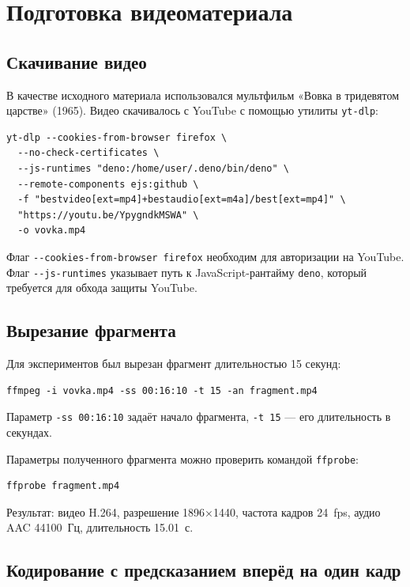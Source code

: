 \documentclass[a4paper,12pt]{article}
\begin{document}
\section{Подготовка видеоматериала}

\subsection{Скачивание видео}

В качестве исходного материала использовался мультфильм «Вовка в тридевятом царстве» (1965).
Видео скачивалось с YouTube с помощью утилиты \texttt{yt-dlp}:

\begin{verbatim}
yt-dlp --cookies-from-browser firefox \
  --no-check-certificates \
  --js-runtimes "deno:/home/user/.deno/bin/deno" \
  --remote-components ejs:github \
  -f "bestvideo[ext=mp4]+bestaudio[ext=m4a]/best[ext=mp4]" \
  "https://youtu.be/YpygndkMSWA" \
  -o vovka.mp4
\end{verbatim}

Флаг \texttt{-{}-cookies-from-browser firefox} необходим для авторизации на YouTube.
Флаг \texttt{-{}-js-runtimes} указывает путь к JavaScript-рантайму \texttt{deno},
который требуется для обхода защиты YouTube.

\subsection{Вырезание фрагмента}

Для экспериментов был вырезан фрагмент длительностью 15 секунд:

\begin{verbatim}
ffmpeg -i vovka.mp4 -ss 00:16:10 -t 15 -an fragment.mp4
\end{verbatim}

Параметр \texttt{-ss 00:16:10} задаёт начало фрагмента,
\texttt{-t 15} — его длительность в секундах.

Параметры полученного фрагмента можно проверить командой \texttt{ffprobe}:

\begin{verbatim}
ffprobe fragment.mp4
\end{verbatim}

Результат: видео H.264, разрешение 1896×1440, частота кадров 24~fps,
аудио AAC 44100~Гц, длительность 15.01~с.



\subsection{Кодирование с предсказанием вперёд на один кадр}
\end{document}
